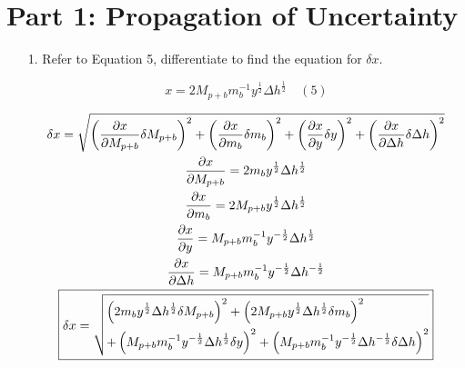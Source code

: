\documentclass[12pt, letterpaper]{article}
\begin{document}
    \section*{Part 1: Propagation of Uncertainty}
    \begin{enumerate}
        \item[1.] Refer to Equation 5, differentiate to find the equation for $\delta x$.
        
        \begin{mdframed}
            \begin{equation*}
                x = 2M_{p+b}m_{b}^{-1}y^{\frac{1}{2}}\Delta h^{\frac{1}{2}} \quad (5)
            \end{equation*}

            \begin{equation*}
                \begin{gathered}
                    \delta x = \sqrt{
                        \left(\frac{\partial x}{\partial M_{p+b}}\delta M_{p+b}\right)^{2} + 
                        \left(\frac{\partial x}{\partial m_{b}}\delta m_{b}\right)^{2} + 
                        \left(\frac{\partial x}{\partial y}\delta y\right)^{2} + 
                        \left(\frac{\partial x}{\partial \Delta h}\delta \Delta h\right)^{2}
                    }\\
                    \frac{\partial x}{\partial M_{p+b}} = 2m_{b}y^{\frac{1}{2}}\Delta h^{\frac{1}{2}} \\
                    \frac{\partial x}{\partial m_{b}} = 2M_{p+b}y^{\frac{1}{2}}\Delta h^{\frac{1}{2}} \\
                    \frac{\partial x}{\partial y} = M_{p+b}m_{b}^{-1}y^{-\frac{1}{2}}\Delta h^{\frac{1}{2}} \\
                    \frac{\partial x}{\partial \Delta h} = M_{p+b}m_{b}^{-1}y^{-\frac{1}{2}}\Delta h^{-\frac{1}{2}} \\
                    \boxed{\delta x = \sqrt{\begin{lgathered}
                        \left(2m_{b}y^{\frac{1}{2}}\Delta h^{\frac{1}{2}}\delta M_{p+b}\right)^{2} + 
                        \left(2M_{p+b}y^{\frac{1}{2}}\Delta h^{\frac{1}{2}}\delta m_{b}\right)^{2} \\ +
                        \left(M_{p+b}m_{b}^{-1}y^{-\frac{1}{2}}\Delta h^{\frac{1}{2}}\delta y\right)^{2} + 
                        \left(M_{p+b}m_{b}^{-1}y^{-\frac{1}{2}}\Delta h^{-\frac{1}{2}}\delta \Delta h\right)^{2}
                    \end{lgathered}}}
                \end{gathered}
            \end{equation*}
        \end{mdframed}


\end{enumerate}
\end{document}
